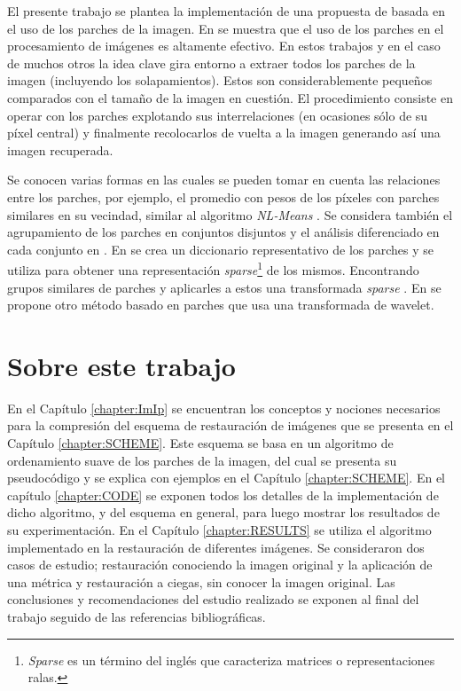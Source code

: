 El presente trabajo se plantea la implementaci\'on de una propuesta de \II\quad basada en el uso de los parches de la imagen. En \cite{buades2005review,chatterjee2009clustering,yu2010image,yu2011solving,dong2011image,dong2011sparsity,zoran2011learning,elad2006image,mairal2007sparse,mairal2009non,zeyde2010single,dabov2007image,li2008patch} se muestra que el uso de los parches en el procesamiento de im\'agenes es altamente efectivo. En estos trabajos y en el caso de muchos otros la idea clave gira entorno a extraer todos los parches de la imagen (incluyendo los solapamientos). Estos son considerablemente pequeños comparados con el tamaño de la imagen en cuesti\'on. El procedimiento consiste en operar con los parches explotando sus interrelaciones (en ocasiones s\'olo de su p\'ixel central) y finalmente recolocarlos de vuelta a la imagen generando as\'i una imagen recuperada.

Se conocen varias formas en las cuales se pueden tomar en cuenta las relaciones entre los parches, por ejemplo, el promedio con pesos de los p\'ixeles con parches similares en su vecindad, similar al algoritmo \textit{NL-Means} \cite{buades2005review}. Se considera tambi\'en el agrupamiento de los parches en conjuntos disjuntos y el análisis diferenciado en cada conjunto en \cite{chatterjee2009clustering,yu2010image,yu2011solving,dong2011image,dong2011sparsity,zoran2011learning}. En \cite{elad2006image,mairal2007sparse,mairal2009non,zeyde2010single} se crea un diccionario representativo de los parches y se utiliza para obtener una representaci\'on \textit{sparse}\footnote{\textit{Sparse} es un término del inglés que caracteriza matrices o representaciones ralas.} de los mismos. Encontrando grupos similares de parches y aplicarles a estos una transformada \textit{sparse} \cite{mairal2009non,dabov2007image,li2008patch}. En \cite{ram2011generalized,ram2012redundant} se propone otro m\'etodo basado en parches que usa una transformada de wavelet.

\section*{Sobre este trabajo}

En el Cap\'itulo \ref{chapter:ImIp} se encuentran los conceptos y nociones necesarios para la compresi\'on del esquema de restauraci\'on de im\'agenes que se presenta en el Cap\'itulo \ref{chapter:SCHEME}. Este esquema se basa en un algoritmo de ordenamiento suave de los parches de la imagen, del cual se presenta su pseudoc\'odigo y se explica con ejemplos en el Cap\'itulo \ref{chapter:SCHEME}. En el cap\'itulo \ref{chapter:CODE} se exponen todos los detalles de la implementaci\'on de dicho algoritmo, y del esquema en general, para luego mostrar los resultados de su experimentaci\'on. En el Cap\'itulo \ref{chapter:RESULTS} se utiliza el algoritmo implementado en la restauración de diferentes imágenes. Se consideraron dos casos de estudio; restauración conociendo la imagen original y la aplicación de una métrica y restauración a ciegas, sin conocer la imagen original. Las conclusiones y recomendaciones del estudio realizado se exponen al final del trabajo seguido de las referencias bibliográficas.
